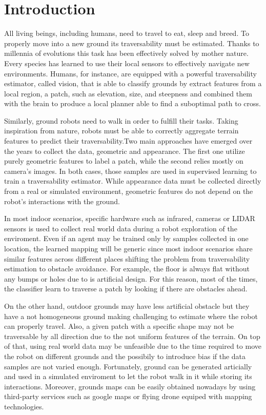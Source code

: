 \documentclass[../document.tex]{subfiles}
\begin{document}
\section{Introduction}

All living beings, including humans, need to travel to eat, sleep and breed. To properly move into a new ground its traversability must be estimated. Thanks to millennia of evolutions this task has been effectively solved by mother nature. Every species has learned to use their local sensors to effectively navigate new environments. Humans, for instance, are equipped with a powerful traversability estimator, called vision, that is able to classify grounds by extract features from a local region, a patch, such as elevation, size, and steepness and combined them with the brain to produce a local planner able to find a suboptimal path to cross.

Similarly, ground robots need to walk in order to fulfill their tasks. Taking inspiration from nature, robots must be able to correctly aggregate terrain features to predict their traversability.Two main approaches have emerged over the years to collect the data, geometric and appearance. The first one utilize purely geometric features to label a patch, while the second relies mostly on camera's images. In both cases, those samples are used in supervised learning to train a traversability estimator. While appearance data must be collected directly from a real or simulated environment, geometric features do not depend on the robot's interactions with the ground. 

In most indoor scenarios, specific hardware such as infrared, cameras or LIDAR sensors is used to collect real world data during a robot exploration of the enviroment. Even if an agent may be trained only by samples collected in one location, the learned mapping will be generic since most indoor scenarios share similar features across different places shifting the problem from traversability estimation to obstacle avoidance. For example, the floor is always flat without any bumps or holes due to is artificial design. For this reason, most of the times, the classifier learn to traverse a patch by looking if there are obstacles ahead.

On the other hand, outdoor grounds may have less artificial obstacle but they have a not homogeneous ground making challenging to estimate where the robot can properly travel. Also, a given patch with a specific shape may not be traversable by all direction due to the not uniform features of the terrain. On top of that, using real world data may be unfeasible due to the time required to move the robot on different grounds and the possibily to introduce bias if the data samples are not varied enough. Fortunately, ground can be generated articially and used in a simulated enviroment to let the robot walk in it while storing its interactions. Moreover, grounds maps can be easily obtained nowadays by using third-party services such as google maps or flying drone equiped with mapping technologies.
\end{document}
